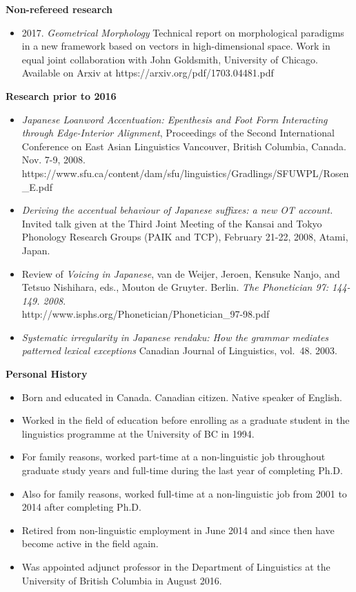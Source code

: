 \documentclass[11pt]{article}
\newcommand{\itt}[1]{\textit{#1}}
\newcommand{\bo}[1]{\textbf{#1}}
\newcommand{\bi}{\begin{itemize}}
\newcommand{\ii}{\item}
\newcommand{\ei}{\end{itemize}}
\begin{document}


\noindent\bo{Non-refereed research}

\bi
\ii[] 2017. \textit{Geometrical Morphology} Technical report on morphological paradigms in a new framework based on vectors in high-dimensional space. Work in equal joint collaboration with John Goldsmith, University of Chicago. Available on Arxiv at https://arxiv.org/pdf/1703.04481.pdf 
\ei

\noindent \bo{Research prior to 2016}
\bi
\ii[] \textit{Japanese Loanword Accentuation: Epenthesis and Foot Form Interacting through Edge-Interior Alignment}, Proceedings of the Second International Conference on East Asian Linguistics Vancouver, British Columbia, Canada. Nov. 7-9, 2008.\\ 
https://www.sfu.ca/content/dam/sfu/linguistics/Gradlings/SFUWPL/Rosen\_E.pdf

\ii[] \textit{Deriving the accentual behaviour of Japanese suffixes: a new OT account.} Invited talk given at the Third Joint Meeting of the Kansai and Tokyo Phonology Research Groups (PAIK and TCP), February 21-22, 2008, Atami, Japan. 
\ii[] Review of \textit{Voicing in Japanese}, van de Weijer, Jeroen, Kensuke Nanjo, and Tetsuo Nishihara, eds., Mouton de Gruyter. Berlin. \textit{The Phonetician 97: 144-149. 2008}.\\
 http://www.isphs.org/Phonetician/Phonetician\_97-98.pdf
\ii[] \textit{Systematic irregularity in Japanese rendaku: How the grammar mediates patterned lexical exceptions}
Canadian Journal of Linguistics, vol.\ 48. 2003.
\ei

\noindent \textbf{Personal History}
\begin{itemize}
\ii[] Born and educated in Canada. Canadian citizen. Native speaker of English. 
\ii[] Worked in the field of education before enrolling as a graduate student in the linguistics programme at the University of BC in 1994. 
\ii[] For family reasons, worked part-time at a non-linguistic job throughout graduate study years and full-time during the last year of completing Ph.D.
\ii[] Also for family reasons, worked full-time at a non-linguistic job from 2001 to 2014 after completing Ph.D.
\ii[] Retired from non-linguistic employment in June 2014 and since then have become active in the field again.
\ii[] Was appointed adjunct professor in the Department of Linguistics at the University of British Columbia in August 2016.
\end{itemize}
\end{document}
